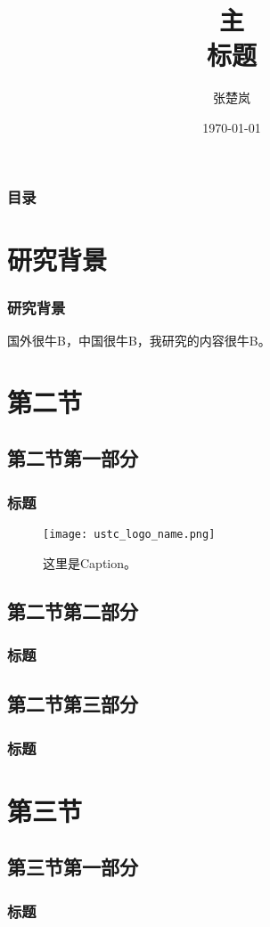 \documentclass[xetex,mathserif,serif,handout]{beamer}
\begin{document}
	\title[页脚中的简写标题]{主\\标题}
	\author{张楚岚}
	\date{\today}

	\frame{\titlepage}

	\begin{frame}
		\frametitle{目录}
		\makecontents
	\end{frame}

	\section{研究背景}
	\begin{frame}
		\frametitle{研究背景}
		国外很牛B，中国很牛B，我研究的内容很牛B。\cite{wootters1982single}
	\end{frame}

	\section{第二节}
	\subsection{第二节第一部分}
	\begin{frame}
		\frametitle{标题}
		\begin{figure}
			\centering
			\texttt{[image: ustc\_logo\_name.png]}
			\caption{这里是Caption。}
		\end{figure}
	\end{frame}
	\subsection{第二节第二部分}
	\begin{frame}
		\frametitle{标题}
	\end{frame}
	\subsection{第二节第三部分}
	\begin{frame}
		\frametitle{标题}
	\end{frame}


	\section{第三节}
	\subsection{第三节第一部分}
	\begin{frame}
		\frametitle{标题}
	\end{frame}
\end{document}
